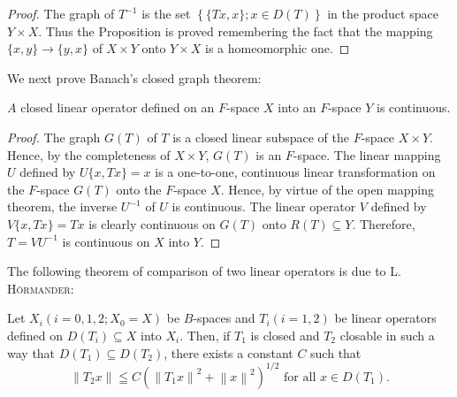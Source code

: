\begin{proof}
 The graph of $T^{-1}$ is the set $\left\{\{Tx, x\}; x \in D(T)\right\}$ in the product space $Y \times X$. Thus the Proposition is proved remembering the fact that the mapping $\{x, y\} \to \{y, x\}$ of $X \times Y$ onto $Y \times X$ is a homeomorphic one. 
\end{proof}

We next prove Banach's closed graph theorem: 

\begin{theorem}\label{thm:II.6.Theorem.1} $A$ closed linear operator defined on an $F$-space $X$ into an $F$-space $Y$ is continuous. 
\end{theorem}

\begin{proof}
 The graph $G(T)$ of $T$ is a closed linear subspace of the $F$-space $X \times Y$. Hence, by the completeness of $X \times Y$, $G(T)$ is an $F$-space. The linear mapping $U$ defined by $U\{x, Tx\} = x$ is a one-to-one, continuous linear transformation on the $F$-space $G(T)$ onto the $F$-space $X$. Hence, by virtue of the open mapping theorem, the inverse $U^{-1}$ of $U$ is continuous. The linear operator $V$ defined by $V\{x, Tx\} = Tx$ is clearly continuous on $G(T)$ onto $R(T) \subseteq Y$. Therefore, $T = VU^{-1}$ is continuous on $X$ into $Y$. 
\end{proof}

The following theorem of comparison of two linear operators is due to L. \textsc{Hörmander}: 

\begin{theorem}\label{thm:II.6.Theorem.2} Let $X_{i} (i = 0,1,2; X_{0} = X)$ be $B$-spaces and $T_{i} (i = 1,2)$ be linear operators defined on $D(T_{i}) \subseteq X$ into $X_{i}$. Then, if $T_{1}$ is closed and $T_{2}$ closable in such a way that $D(T_{1}) \subseteq D(T_{2})$, there exists a constant $C$ such that 
\begin{equation}\label{eq:II.6.9}
\left\| T _{2} x \right\| \leqq C \left(\left\| T _{1} x \right\| ^{2} + \left\| x \right\| ^{2}\right) ^{1/2} \text{ for all } x \in D (T _{1}).
\end{equation}
\end{theorem}

